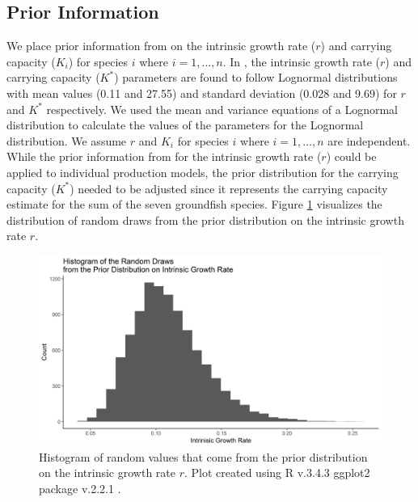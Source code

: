 \documentclass[oneside,12pt,final]{sty/ucthesis-CA2012}
\let\cite\citep                             %
\begin{document}
\begin{mainmatter}
\subsection{Prior Information}
We place prior information from \citet{langseth2018stock} on the intrinsic growth rate ($r$) and carrying capacity ($K_i$) for species $i$ where $i=1,\dots,n$. In \citet{langseth2018stock}, the intrinsic growth rate ($r$) and carrying capacity ($K^*$) parameters are found to follow Lognormal distributions with mean values (0.11 and 27.55) and standard deviation (0.028 and 9.69) for $r$ and $K^*$ respectively.
We used the mean and variance equations of a Lognormal distribution to calculate the  values of the parameters for the Lognormal distribution. We assume $r$ and $K_i$ for species $i$ where $i=1,\dots,n$ are independent. While the prior information from \citet{langseth2018stock} for the intrinsic growth rate ($r$) could be applied to individual production models, the prior distribution for the carrying capacity ($K^*$) needed to be adjusted since it represents the carrying capacity estimate for the sum of the seven groundfish species. Figure \ref{priorr} visualizes the distribution of random draws from the prior distribution on the intrinsic growth rate $r$.

\begin{figure}[H]
     \centering
       \includegraphics[width=.9\textwidth]{fig/hist_prior_r}
    \caption{Histogram of random values that come from the prior distribution on the intrinsic growth rate $r$. Plot created using R v.3.4.3 \cite{Rcite} ggplot2 package v.2.2.1 \cite{ggplot}. }
    \label{priorr}
\end{figure}


\end{mainmatter}
\end{document}
